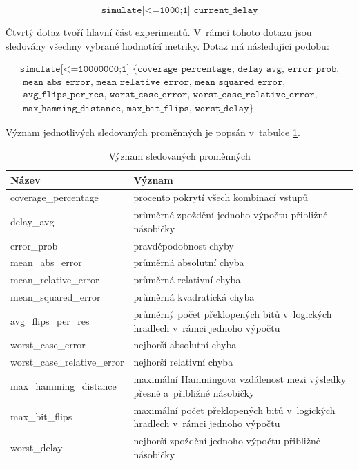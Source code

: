 \begin{equation*}
    \texttt{simulate[<=1000;1] {current\_delay}}
\end{equation*}

Čtvrtý dotaz tvoří hlavní část experimentů. V~rámci tohoto dotazu jsou sledovány všechny vybrané hodnotící metriky. Dotaz má následující podobu:

\begin{equation*}
    \begin{array}{l}
        \texttt{simulate[<=10000000;1] \{coverage\_percentage, delay\_avg, error\_prob,} \\
        \texttt{    mean\_abs\_error, mean\_relative\_error, mean\_squared\_error,} \\
        \texttt{    avg\_flips\_per\_res, worst\_case\_error, worst\_case\_relative\_error,} \\
        \texttt{    max\_hamming\_distance, max\_bit\_flips, worst\_delay\}}
    \end{array}
\end{equation*}

Význam jednotlivých sledovaných proměnných je popsán v~tabulce \ref{tab:var_expl}.

\begin{table}[!ht]
    \centering
    \begin{tabularx}{\textwidth}{l|X}
        \textbf{Název} & \textbf{Význam} \\ \hline
        coverage\_percentage & procento pokrytí všech kombinací vstupů \\ \hline
        delay\_avg & průměrné zpoždění jednoho výpočtu přibližné násobičky \\ \hline
        error\_prob & pravděpodobnost chyby \\ \hline
        mean\_abs\_error & průměrná absolutní chyba \\ \hline
        mean\_relative\_error & průměrná relativní chyba \\ \hline
        mean\_squared\_error & průměrná kvadratická chyba \\ \hline
        avg\_flips\_per\_res & průměrný počet překlopených bitů v~logických hradlech v~rámci jednoho výpočtu \\ \hline
        worst\_case\_error & nejhorší absolutní chyba \\ \hline
        worst\_case\_relative\_error & nejhorší relativní chyba \\ \hline
        max\_hamming\_distance & maximální Hammingova vzdálenost mezi výsledky přesné a~přibližné násobičky \\ \hline
        max\_bit\_flips & maximální počet překlopených bitů v~logických hradlech v~rámci jednoho výpočtu \\ \hline
        worst\_delay & nejhorší zpoždění jednoho výpočtu přibližné násobičky \\ 
    \end{tabularx}
    \caption{Význam sledovaných proměnných}
    \label{tab:var_expl}
\end{table}

